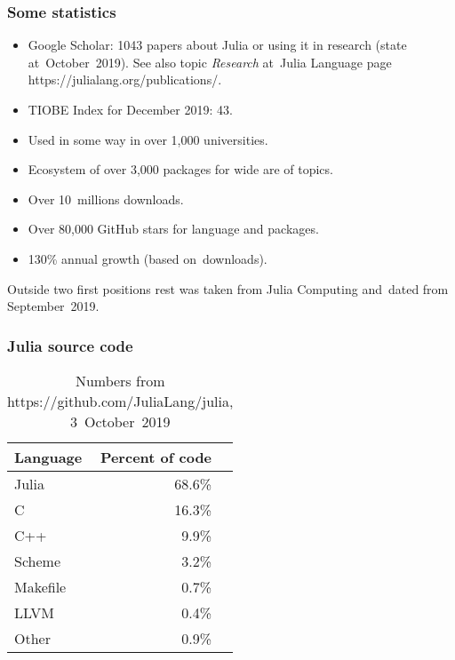 \documentclass[10pt,t]{beamer}
\begin{document}
\begin{frame}
  \frametitle{Some statistics}


  \begin{itemize}

  \item Google Scholar: 1043 papers about Julia or using it in research
    (state at~October~2019). See also topic \textit{Research}
    at~Julia Language page
    {https://julialang.org/publications/}.

  \item TIOBE Index for December 2019: 43.

  \item Used in some way in over 1,000 universities.

  \item Ecosystem of over 3,000 packages for wide are of topics.

  \item Over 10~millions downloads.

  \item Over 80,000 GitHub stars for language and packages.

  \item 130\% annual growth (based on~downloads).

  \end{itemize}


  Outside two first positions rest was taken from Julia
  Computing and~dated from September~2019.

\end{frame}





\begin{frame}
  \frametitle{Julia source code}


  \begin{table}

    \centering

    \begin{tabular}{|l|r|r|}
      \hline
      Language & Percent of code \\
      \hline
      Julia & 68.6\% \\
      \hline
      C & 16.3\% \\
      \hline
      C++ & 9.9\% \\
      \hline
      Scheme & 3.2\% \\
      \hline
      Makefile & 0.7\% \\
      \hline
      LLVM & 0.4\% \\
      \hline
      Other & 0.9\% \\
      \hline
    \end{tabular}

    \caption{Numbers from 
      {https://github.com/JuliaLang/julia}, 3~October~2019}

  \end{table}

\end{frame}
\end{document}
